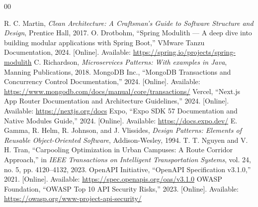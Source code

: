 \documentclass[conference,10pt,a4paper]{IEEEtran}
\begin{document}
\begin{thebibliography}{00}

 R. C. Martin, \textit{Clean Architecture: A Craftsman's Guide to Software Structure and Design}, Prentice Hall, 2017.
 O. Drotbohm, ``Spring Modulith --- A deep dive into building modular applications with Spring Boot,'' VMware Tanzu Documentation, 2024. [Online]. Available: \url{https://spring.io/projects/spring-modulith}
 C. Richardson, \textit{Microservices Patterns: With examples in Java}, Manning Publications, 2018.
 MongoDB Inc., ``MongoDB Transactions and Concurrency Control Documentation,'' 2024. [Online]. Available: \url{https://www.mongodb.com/docs/manual/core/transactions/}
 Vercel, ``Next.js App Router Documentation and Architecture Guidelines,'' 2024. [Online]. Available: \url{https://nextjs.org/docs}
 Expo, ``Expo SDK 57 Documentation and Native Modules Guide,'' 2024. [Online]. Available: \url{https://docs.expo.dev/}
 E. Gamma, R. Helm, R. Johnson, and J. Vlissides, \textit{Design Patterns: Elements of Reusable Object-Oriented Software}, Addison-Wesley, 1994.
 T. T. Nguyen and V. H. Tran, ``Carpooling Optimization in Urban Campuses: A Route Corridor Approach,'' in \textit{IEEE Transactions on Intelligent Transportation Systems}, vol. 24, no. 5, pp. 4120--4132, 2023.
 OpenAPI Initiative, ``OpenAPI Specification v3.1.0,'' 2021. [Online]. Available: \url{https://spec.openapis.org/oas/v3.1.0}
 OWASP Foundation, ``OWASP Top 10 API Security Risks,'' 2023. [Online]. Available: \url{https://owasp.org/www-project-api-security/}

\end{thebibliography}
\end{document}
